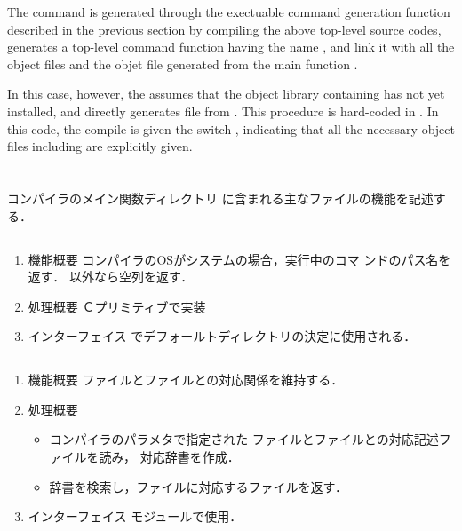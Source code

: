 	The \smlsharp{} command is generated through the 
exectuable command generation function described in the previous section
by compiling the above top-level source codes, generates a top-level
command function having the name , and link it with all
the object files and the objet file  generated 
from the main function .

	In this case, however, the \smlsharp{} assumes that the object
library containing  has not yet installed, 
and directly generates  file from 
.
	This procedure is hard-coded in .
	In this code, the compile is given the switch ,
indicating that all the necessary object files including 
 are explicitly given.
\fi%

\section{}

\ifjp%
	コンパイラのメイン関数ディレクトリ
に含まれる主なファイルの機能を記述する．

\subsection{}
\begin{enumerate}
\item 機能概要 コンパイラのOSがシステムの場合，実行中のコマ
ンドのパス名を返す．
	以外なら空列を返す．
\item 処理概要 Ｃプリミティブで実装
\item インターフェイス でデフォールトディレクトリの決定に使用される．
\end{enumerate}
	
\subsection{}
\begin{enumerate}
\item 機能概要 ファイルとファイルとの対応関係を維持する．
\item 処理概要 
\begin{itemize}
\item \smlsharp{}コンパイラのパラメタで指定された
ファイルとファイルとの対応記述ファイルを読み，
対応辞書を作成．
\item 辞書を検索し，ファイルに対応するファイルを返す．
\end{itemize}
\item インターフェイス モジュールで使用．
\end{enumerate}

